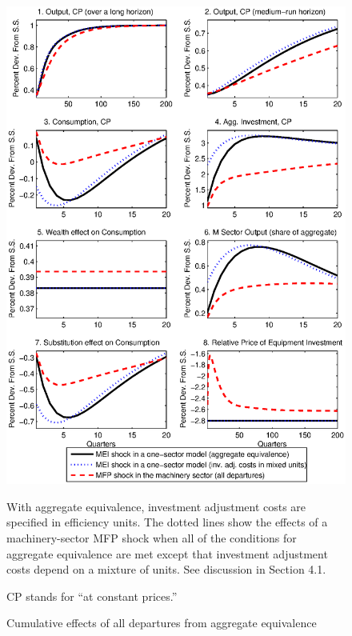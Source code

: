 \documentclass[12pt,fleqn]{article}
\begin{document}
\begin{figure}[tbp] \center
\caption{Cumulative effects of all departures from aggregate
equivalence} \label{figure_k1}

\includegraphics[scale=0.8]{figure_k.ps}

\footnotesize \flushleft \noindent With aggregate equivalence,
investment adjustment costs are specified in efficiency units. The
dotted lines show the effects of a machinery-sector MFP shock when
all of the conditions for aggregate equivalence are met except
that investment adjustment costs depend on a mixture of units. See
discussion in Section 4.1.

\noindent CP stands for ``at constant prices.''
\end{figure}
\end{document}
